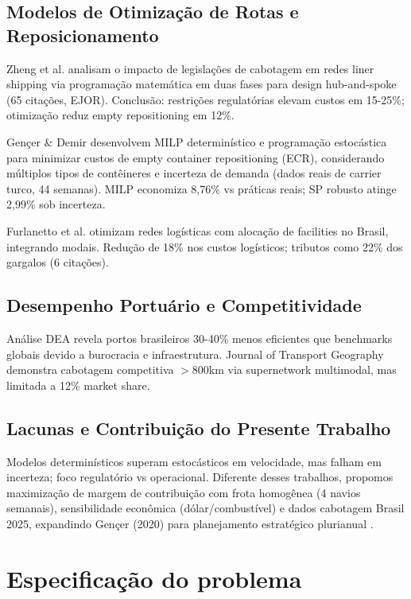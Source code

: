 \documentclass[preprint,10pt,5p]{elsarticle}
\begin{document}
\subsection{Modelos de Otimização de Rotas e Reposicionamento}

Zheng et al. \cite{zhen2014} analisam o impacto de legislações de cabotagem em redes liner shipping via programação matemática em duas fases para design hub-and-spoke (65 citações, EJOR). Conclusão: restrições regulatórias elevam custos em 15-25\%; otimização reduz empty repositioning em 12\%.

Gençer \& Demir \cite{gencer2020} desenvolvem MILP determinístico e programação estocástica para minimizar custos de empty container repositioning (ECR), considerando múltiplos tipos de contêineres e incerteza de demanda (dados reais de carrier turco, 44 semanas). MILP economiza 8,76\% vs práticas reais; SP robusto atinge 2,99\% sob incerteza.

Furlanetto et al. \cite{furlanetto2020} otimizam redes logísticas com alocação de facilities no Brasil, integrando modais. Redução de 18\% nos custos logísticos; tributos como 22\% dos gargalos (6 citações).

\subsection{Desempenho Portuário e Competitividade}

Análise DEA \cite{portos2018} revela portos brasileiros 30-40\% menos eficientes que benchmarks globais devido a burocracia e infraestrutura. Journal of Transport Geography \cite{jtg2025} demonstra cabotagem competitiva $>$800km via supernetwork multimodal, mas limitada a 12\% market share.

\subsection{Lacunas e Contribuição do Presente Trabalho}

Modelos determinísticos \cite{zhen2014} superam estocásticos \cite{gencer2020} em velocidade, mas falham em incerteza; foco regulatório vs operacional. Diferente desses trabalhos, propomos maximização de margem de contribuição com frota homogênea (4 navios semanais), sensibilidade econômica (dólar/combustível) e dados cabotagem Brasil 2025, expandindo Gençer (2020) para planejamento estratégico plurianual \cite{gencer2020,zhen2014}.


\section{Especificação do problema}
\end{document}
